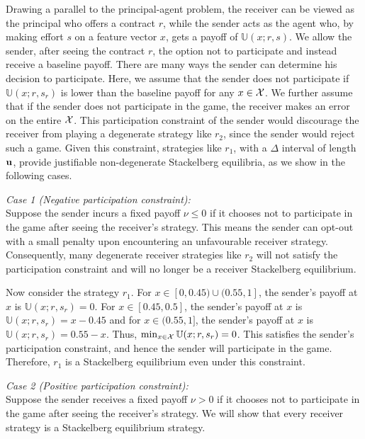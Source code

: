 Drawing a parallel to the principal-agent problem, the receiver can be viewed as the principal who offers a contract $r$, while the sender acts as the agent who, by making effort $s$ on a feature vector $x$, gets a payoff of $\mathbb{U}(x; r, s)$. We allow the sender, after seeing the contract $r$, the option not to participate and instead receive a baseline payoff. There are many ways the sender can determine his decision to participate. Here, we assume that the sender does not participate if $\mathbb{U}(x; r, s_r)$ is lower than the baseline payoff for any $x \in \mathcal{X}$. We further assume that if the sender does not participate in the game, the receiver makes an error on the entire $\mathcal{X}$. This participation constraint of the sender would discourage the receiver from playing a degenerate strategy like $r_2$, since the sender would reject such a game. Given this constraint, strategies like $r_1$, with a $\Delta$ interval of length $\mathbf{u}$, provide justifiable non-degenerate Stackelberg equilibria, as we show in the following cases.


\noindent \textit{Case 1 (Negative participation constraint): }\\
Suppose the sender incurs a fixed payoff $\nu \leq 0$ if it chooses not to participate in the game after seeing the receiver's strategy. This means the sender can opt-out with a small penalty upon encountering an unfavourable receiver strategy. Consequently, many degenerate receiver strategies like $r_2$ will not satisfy the participation constraint and will no longer be a receiver Stackelberg equilibrium.

Now consider the strategy $r_1$. For $x \in [0, 0.45) \cup (0.55, 1]$, the sender's payoff at $x$ is $\mathbb{U}(x; r, s_r) = 0$. For $x \in [0.45, 0.5]$, the sender's payoff at $x$ is $\mathbb{U}(x; r, s_r) = x - 0.45$ and for $x \in (0.55, 1]$, the sender's payoff at $x$ is $\mathbb{U}(x; r, s_r) = 0.55 - x$. Thus, $\min_{x \in \mathcal{X}} \mathbb{U}(x; r, s_r) = 0$. This satisfies the sender's participation constraint, and hence the sender will participate in the game. Therefore, $r_1$ is a Stackelberg equilibrium even under this constraint.

\noindent \textit{Case 2 (Positive participation constraint): }\\
Suppose the sender receives a fixed payoff $\nu > 0$ if it chooses not to participate in the game after seeing the receiver's strategy. We will show that every receiver strategy is a Stackelberg equilibrium strategy.

